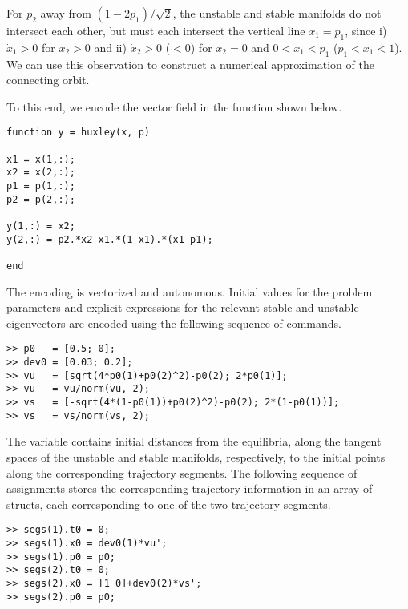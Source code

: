 For $p_2$ away from $(1-2p_1)/\sqrt{2}$, the unstable and stable manifolds do not intersect each other, but must each intersect the vertical line $x_1=p_1$, since i) $\dot{x}_1>0$ for $x_2>0$ and ii) $\dot{x}_2>0$ ($<0$) for $x_2=0$ and $0<x_1<p_1$ ($p_1<x_1<1$). We can use this observation to construct a numerical approximation of the connecting orbit.

To this end, we encode the vector field in the function  shown below.
\begin{lstlisting}[language=coco-highlight]
function y = huxley(x, p)

x1 = x(1,:);
x2 = x(2,:);
p1 = p(1,:);
p2 = p(2,:);

y(1,:) = x2;
y(2,:) = p2.*x2-x1.*(1-x1).*(x1-p1);

end
\end{lstlisting}
The encoding is vectorized and autonomous. Initial values for the problem parameters and explicit expressions for the relevant stable and unstable eigenvectors are encoded using the following sequence of commands.
\begin{lstlisting}[language=coco-highlight]
>> p0   = [0.5; 0];
>> dev0 = [0.03; 0.2];
>> vu   = [sqrt(4*p0(1)+p0(2)^2)-p0(2); 2*p0(1)];
>> vu   = vu/norm(vu, 2);
>> vs   = [-sqrt(4*(1-p0(1))+p0(2)^2)-p0(2); 2*(1-p0(1))];
>> vs   = vs/norm(vs, 2);
\end{lstlisting}
The  variable contains initial distances from the equilibria, along the tangent spaces of the unstable and stable manifolds, respectively, to the initial points along the corresponding trajectory segments. The following sequence of assignments stores the corresponding trajectory information in an array of structs, each corresponding to one of the two trajectory segments.
\begin{lstlisting}[language=coco-highlight]
>> segs(1).t0 = 0;
>> segs(1).x0 = dev0(1)*vu';
>> segs(1).p0 = p0;
>> segs(2).t0 = 0;
>> segs(2).x0 = [1 0]+dev0(2)*vs';
>> segs(2).p0 = p0;
\end{lstlisting}

